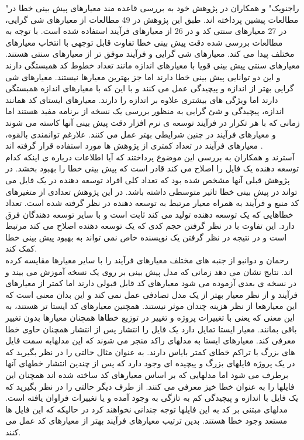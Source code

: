 "راجنویک" و همکاران در پژوهش خود به بررسی قاعده مند  معیارهای پیش بینی خطا در مطالعات پیشین پرداخته اند.  طبق این پژوهش در 49\lr{\%} مطالعات از معیارهای شی گرایی، در 27 \lr{\%} معیارهای سنتی کد و در 26 \lr{\%} از معیارهای فرآیند استفاده شده است. با توجه به مطالعات بررسی شده دقت پیش بینی خطا تفاوت قابل توجهی با انتخاب معیارهای مختلف پیدا می کند. معیارهای شی گرایی و فرآیند موفق تر از معیارهای سنتی هستند. معیارهای سنتی پیش بینی قویا با معیارهای اندازه مانند تعداد خطوط کد همبستگی دارند و این دو توانایی پیش بینی خطا دارند اما جز بهترین معیارها نیستند. معیارهای شی گرایی بهتر از اندازه و پیچیدگی عمل می کنند و با این که با معیارهای اندازه همبستگی دارند اما ویژگی های بیشتری علاوه بر اندازه را دارند. معیارهای ایستای کد همانند اندازه، پیچیدگی و شئ گرایی به منظور بررسی یک نسخه از برنامه مفید هستند اما زمانی که با هر تکرار در فرآیند توسعه ی نرم افزار دقت پیش بینی آنها کاسته می شوند و معیارهای فرآیند در چنین شرایطی بهتر عمل می کنند. علارغم توانمندی بالقوه، معیارهای فرآیند در تعداد کمتری از پژوهش ها مورد استفاده قرار گرفته اند \cite{radjenovic2013software}. \\
 
آسترند و همکاران به بررسی این موضوع پرداختند که آیا اطلاعات درباره ی اینکه کدام توسعه دهنده یک فایل را اصلاح می کند قادر است که پیش بینی خطا را بهبود بخشد. در پژوهش قبلی آنها\cite{weyuker2008too} مشخص شده بود که تعداد کلی افراد توسعه دهنده در یک فایل می تواند در پیش بینی خطا تاثیر متوسطی داشته باشد. در این پژوهش تعدادی از متغیرهای کد منبع و فرآیند به همراه معیار مرتبط به توسعه دهنده در نظر گرفته شده است. تعداد خطاهایی که یک توسعه دهنده تولید می کند ثابت است و با سایر توسعه دهندگان فرق دارد. این تفاوت با در نظر گرفتن حجم کدی که یک توسعه دهنده اصلاح می کند مرتبط است و در نتیجه در نظر گرفتن یک نویسنده خاص نمی تواند به بهبود پیش بینی خطا کمک کند\cite{ostrand2010programmer}. \\

رحمان و دوانبو از جنبه های مختلف معیارهای فرآیند  را با سایر معیارها مقایسه کرده اند\cite{rahman2013and}. نتایج نشان می دهد  زمانی که مدل پیش بینی بر روی یک نسخه آموزش می بیند و در نسخه ی بعدی آزموده می شود معیارهای کد  قابل قبولی دارند اما کمتر از معیارهای فرآیند و از نظر معیار 
بهتر از یک مدل تصادفی عمل نمی کند و این بدان معنی است که این معیارهعا از نظر هزینه چندان  موثر نیستند. همچنین معیارهای کد ایستا تر هستند، به این معنی که یعنی با تغییرات پروژه و تغییر در توزیع خطاها همچنان معیارها بدون تغییر باقی بمانند. معیار ایستا تمایل دارد یک فایل را انتشار پس از انتشار همچنان حاوی خطا معرفی کند. معیارهای ایستا به مدلهای راکد منجر می شوند که این مدلهابه سمت فایل های بزرگ با تراکم خطای کمتر بایاس دارند. به عنوان مثال حالتی را در نظر بگیرید که در یک پروژه فایلهای بزرگ و پیچیده ای وجود دارد که پس از چندین انتشار خطهای آنها برطرف می شود اما مدلهایی که بر اساس معیارهای کد ساخته شده اند همچنان این فایلها را به عنوان خطا خیز معرفی می کنند. از طرف دیگر حالتی را در نظر بگیرید که یک فایل با اندازه و پیچیدگی کم به تازگی به وجود آمده و یا تغییرات فراوان یافته است. مدلهای مبتنی بر کد به این فایلها توجه چندانی نخواهند کرد در حالیکه که این فایل ها مستعد وجود خطا هستند. بدین ترتیب معیارهای فرآیند بهتر از معیارهای کد عمل می کنند. 
 
 
